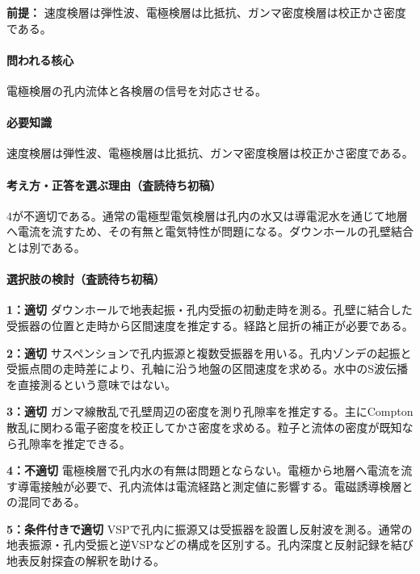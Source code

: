 \noindent\textbf{前提：} 速度検層は弾性波、電極検層は比抵抗、ガンマ密度検層は校正かさ密度である。\par

\paragraph{問われる核心} 電極検層の孔内流体と各検層の信号を対応させる。

\paragraph{必要知識} 速度検層は弾性波、電極検層は比抵抗、ガンマ密度検層は校正かさ密度である。

\paragraph{考え方・正答を選ぶ理由（査読待ち初稿）} 4が不適切である。通常の電極型電気検層は孔内の水又は導電泥水を通じて地層へ電流を流すため、その有無と電気特性が問題になる。ダウンホールの孔壁結合とは別である。

\paragraph{選択肢の検討（査読待ち初稿）}\mbox{}\par

\noindent\textbf{1：適切} ダウンホールで地表起振・孔内受振の初動走時を測る。孔壁に結合した受振器の位置と走時から区間速度を推定する。経路と屈折の補正が必要である。\par

\noindent\textbf{2：適切} サスペンションで孔内振源と複数受振器を用いる。孔内ゾンデの起振と受振点間の走時差により、孔軸に沿う地盤の区間速度を求める。水中のS波伝播を直接測るという意味ではない。\par

\noindent\textbf{3：適切} ガンマ線散乱で孔壁周辺の密度を測り孔隙率を推定する。主にCompton散乱に関わる電子密度を校正してかさ密度を求める。粒子と流体の密度が既知なら孔隙率を推定できる。\par

\noindent\textbf{4：不適切} 電極検層で孔内水の有無は問題とならない。電極から地層へ電流を流す導電接触が必要で、孔内流体は電流経路と測定値に影響する。電磁誘導検層との混同である。\par

\noindent\textbf{5：条件付きで適切} VSPで孔内に振源又は受振器を設置し反射波を測る。通常の地表振源・孔内受振と逆VSPなどの構成を区別する。孔内深度と反射記録を結び地表反射探査の解釈を助ける。\par

